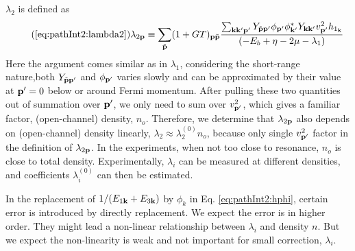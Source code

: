 $\lambda_2$ is defined as
\begin{equation}\tag{\ref{eq:pathInt2:lambda2}}
\lambda_{2\vp}\equiv\sum_{\tilde\vp}(1+GT)_{\vp\tilde\vp}\frac{\sum_{\vk\vk{'}\vp'} Y_{\tilde\vp\vp'}{\phi_{\vp'}}{\phi_{\vk'}^{*}}{Y_{\vk\vk'}}v_{\vp'}^{2}{h_{1_{\vk}}}}
		{\br{-E_{b}+\eta-2\mu-\lambda_{1}}}{}
\end{equation}
Here the argument comes similar as in $\lambda_{1}$, considering the short-range nature,both  $Y_{\tilde{\mathbf{p}}\mathbf{p}'}$ and $\phi_{\mathbf{p}'}$ varies slowly and can be approximated by their value at $\mathbf{p}'=0$ below or around Fermi momentum.  After pulling these two quantities out of  summation over $\mathbf{p}'$, we only need to sum over   $v_{\mathbf{p}'}^{2}$, which gives a familiar factor,  (open-channel) density, $n_{o}$. Therefore, we determine that $\lambda_{2\mathbf{p}}$ also depends on (open-channel) density linearly, $\lambda_2\approx\lambda_2^{(0)}n_{o}$,  because only single $v_{\mathbf{p}'}^2$ factor in the definition of $\lambda_{2\mathbf{p}}$.  In the experiments, when not too close to resonance, $n_o$ is close to total density.  Experimentally, $\lambda_{i}$ can be measured at different densities,  and coefficients $\lambda_{i}^{(0)}$ can then be estimated. 


In the replacement of $1/(E_{1\mathbf{k}}+E_{3\mathbf{k}})$ by $\phi_{k}$ in Eq. \ref{eq:pathInt2:hphi}, certain error is introduced by directly replacement.  We expect the error is in higher order.  They might lead a non-linear relationship between $\lambda_{i}$ and density $n$.  But we expect the non-linearity is weak and not important for small correction, $\lambda_{i}$.



